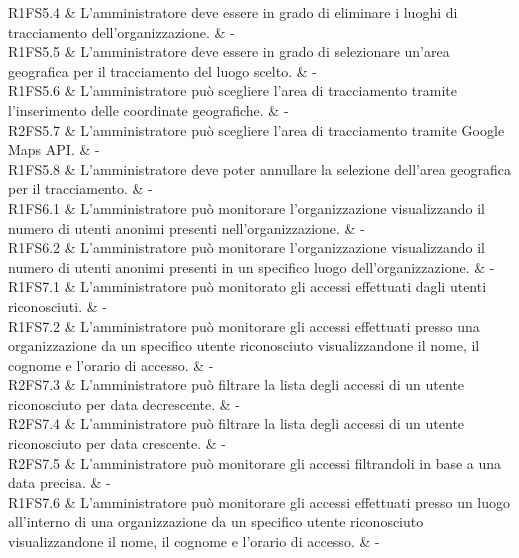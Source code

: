 R1FS5.4 & L'amministratore deve essere in grado di eliminare i luoghi di tracciamento dell'organizzazione.  & - \\

R1FS5.5 & L'amministratore deve essere in grado di selezionare un'area geografica per il tracciamento del luogo scelto.  & - \\

R1FS5.6 &  L'amministratore può scegliere l'area di tracciamento tramite l'inserimento delle coordinate geografiche.  & - \\

R2FS5.7 & L'amministratore può scegliere l'area di tracciamento tramite Google Maps API. & - \\

R1FS5.8 & L'amministratore deve poter annullare la selezione dell'area geografica per il tracciamento. & - \\

R1FS6.1 & L'amministratore può monitorare l'organizzazione visualizzando il numero di utenti anonimi presenti nell'organizzazione.  & - \\

R1FS6.2 & L'amministratore può monitorare l'organizzazione visualizzando il numero di utenti anonimi presenti in un specifico luogo dell'organizzazione.  & - \\

R1FS7.1 & L'amministratore può monitorato gli accessi effettuati dagli utenti riconosciuti.  & - \\

R1FS7.2 & L'amministratore può monitorare gli accessi effettuati presso una organizzazione da un specifico utente riconosciuto visualizzandone il nome, il cognome e l'orario di accesso.  & - \\

R2FS7.3 & L’amministratore può filtrare la lista degli accessi di un utente riconosciuto per data decrescente.  & - \\

R2FS7.4 & L’amministratore può filtrare la lista degli accessi di un utente riconosciuto per data crescente.  & - \\

R2FS7.5 & L'amministratore può monitorare gli accessi filtrandoli in base a una data precisa.  & - \\

R1FS7.6 & L'amministratore può monitorare gli accessi effettuati presso un luogo all'interno di una organizzazione da un specifico utente riconosciuto visualizzandone il nome, il cognome e l'orario di accesso.  & - \\

